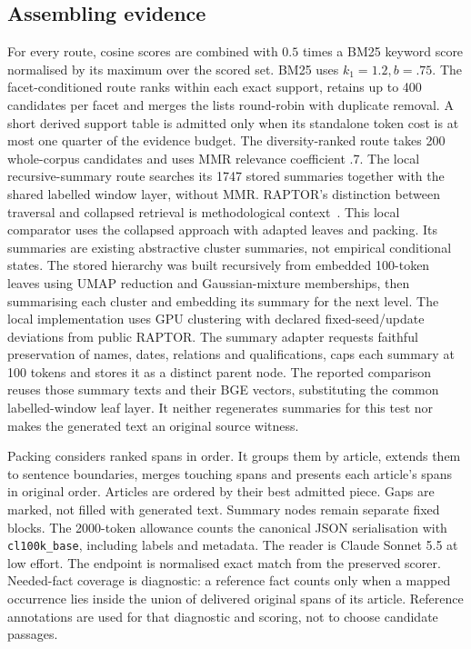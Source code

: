 \subsection{Assembling evidence}
For every route, cosine scores are combined with \(0.5\) times a BM25 keyword score normalised by its maximum over the scored set.
BM25 uses \(k_1=1.2,b=.75\).
The facet-conditioned route ranks within each exact support, retains up to 400 candidates per facet and merges the lists round-robin with duplicate removal.
A short derived support table is admitted only when its standalone token cost is at most one quarter of the evidence budget.
The diversity-ranked route takes 200 whole-corpus candidates and uses MMR relevance coefficient .7.
The local recursive-summary route searches its 1747 stored summaries together with the shared labelled window layer, without MMR.
RAPTOR's distinction between traversal and collapsed retrieval is methodological context~\cite{raptor}.
This local comparator uses the collapsed approach with adapted leaves and packing.
Its summaries are existing abstractive cluster summaries, not empirical conditional states.
The stored hierarchy was built recursively from embedded 100-token leaves using UMAP reduction and Gaussian-mixture memberships, then summarising each cluster and embedding its summary for the next level.
The local implementation uses GPU clustering with declared fixed-seed/update deviations from public RAPTOR.
The summary adapter requests faithful preservation of names, dates, relations and qualifications, caps each summary at 100 tokens and stores it as a distinct parent node.
The reported comparison reuses those summary texts and their BGE vectors, substituting the common labelled-window leaf layer.
It neither regenerates summaries for this test nor makes the generated text an original source witness.

Packing considers ranked spans in order.
It groups them by article, extends them to sentence boundaries, merges touching spans and presents each article's spans in original order.
Articles are ordered by their best admitted piece.
Gaps are marked, not filled with generated text.
Summary nodes remain separate fixed blocks.
The 2000-token allowance counts the canonical JSON serialisation with \texttt{cl100k\_base}, including labels and metadata.
The reader is Claude Sonnet 5.5 at low effort.
The endpoint is normalised exact match from the preserved scorer.
Needed-fact coverage is diagnostic: a reference fact counts only when a mapped occurrence lies inside the union of delivered original spans of its article.
Reference annotations are used for that diagnostic and scoring, not to choose candidate passages.


